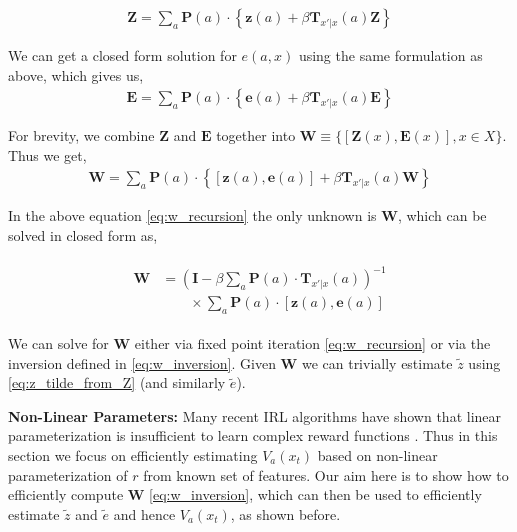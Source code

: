 \documentclass{article}
\begin{document}
\begin{align}\label{eq:Z_defn}
\mathbf{Z} = \sum_{a}\mathbf{P}(a) \cdot \left\{ \mathbf{z}(a) + \beta \mathbf{T}_{x'|x}(a)\mathbf{Z}\right\}
\end{align}

We can get a closed form solution for $e(a, x)$ using the same formulation as above, which gives us,
\begin{align}\label{eq:E_defn}
\mathbf{E} = \sum_{a}\mathbf{P}(a) \cdot \left\{ \mathbf{e}(a) + \beta \mathbf{T}_{x'|x}(a)\mathbf{E}\right\}
\end{align}

For brevity, we combine $\mathbf{Z}$ and $\mathbf{E}$ together into $\mathbf{W} \equiv \{[\mathbf{Z}(x),  \mathbf{E}(x)], x \in X \}$. Thus we get,
\begin{align}\label{eq:w_recursion}
\mathbf{W} = \sum_{a}\mathbf{P}(a) \cdot \left\{ [\mathbf{z}(a), \mathbf{e}(a)] + \beta \mathbf{T}_{x'|x}(a)\mathbf{W}\right\}
\end{align}

In the above equation \eqref{eq:w_recursion} the only unknown is $\mathbf{W}$, which can be solved in closed form as,

\begin{align}\label{eq:w_inversion}
\begin{split}
\mathbf{W} &= \left( \mathbf{I} - \beta \sum_{a}\mathbf{P}(a) \cdot \mathbf{T}_{x'|x}(a) \right)^{-1} \\
& \qquad \times \sum_{a}\mathbf{P}(a) \cdot [\mathbf{z}(a), \mathbf{e}(a)]
\end{split}
\end{align}

We can solve for $\mathbf{W}$ either via fixed point iteration \eqref{eq:w_recursion} or via the inversion defined in \eqref{eq:w_inversion}.
Given $\mathbf{W}$ we can trivially estimate $\tilde{z}$ using \eqref{eq:z_tilde_from_Z} (and similarly $\tilde{e}$).  

\textbf{Non-Linear Parameters:} Many recent IRL algorithms have shown that linear parameterization is insufficient to learn complex reward functions \cite{levine2011nonlinear} \cite{wulfmeier2015maximum}. Thus in this section we focus on efficiently estimating $V_a(x_t)$ based on non-linear parameterization of $r$ from known set of features.
Our aim here is to show how to efficiently compute $\mathbf{W}$ \eqref{eq:w_inversion}, which can then be used to efficiently estimate $\tilde{z}$ and $\tilde{e}$ and hence $V_a(x_t)$, as shown before.
\end{document}
